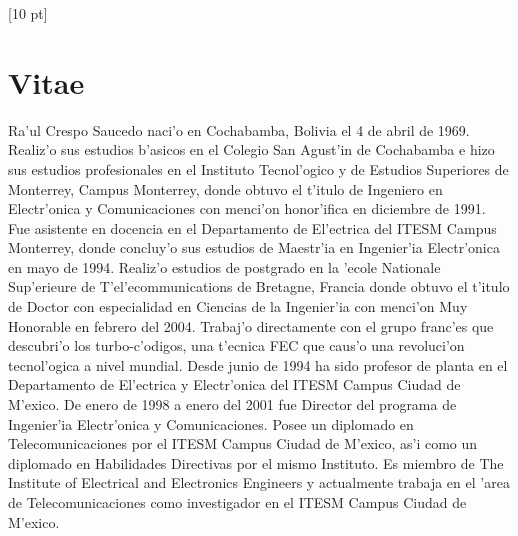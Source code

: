 \titleformat{\chapter}{\Huge\bfseries}{\thechapter}{0 pt}{\rule{340 pt}{3 pt}\\}
\titlespacing{\chapter}{100 pt}{-25 pt}{40 pt}[10 pt]	
\pagestyle{fancy}
\fancyhead[RO,RE]{\thepage}
\fancyfoot[CO,CE]{}

\chapter*{Vitae}

\normalsize
\noindent
Ra'ul Crespo Saucedo naci'o en Cochabamba, Bolivia el 4 de abril de 1969. Realiz'o sus estudios b'asicos en el Colegio San Agust'in de Cochabamba e hizo sus estudios profesionales en el Instituto Tecnol'ogico y de Estudios Superiores de Monterrey, Campus Monterrey, donde obtuvo el t'itulo de Ingeniero en Electr'onica y Comunicaciones con menci'on honor'ifica en diciembre de 1991. Fue asistente en docencia en el Departamento de El'ectrica del ITESM Campus Monterrey, donde concluy'o sus estudios de Maestr'ia en Ingenier'ia Electr'onica en mayo de 1994. Realiz'o estudios de postgrado en la 'ecole Nationale Sup'erieure de T'el'ecommunications de Bretagne, Francia donde obtuvo el t'itulo de Doctor con especialidad en Ciencias de la Ingenier'ia con menci'on Muy Honorable en febrero del 2004. Trabaj'o directamente con el grupo franc'es que descubri'o los turbo-c'odigos, una t'ecnica FEC que caus'o una revoluci'on tecnol'ogica a nivel mundial. Desde junio de 1994 ha sido profesor de planta en el Departamento de El'ectrica y Electr'onica del ITESM Campus Ciudad de M'exico. De enero de 1998 a enero del 2001 fue Director del programa de Ingenier'ia Electr'onica y Comunicaciones. Posee un diplomado en Telecomunicaciones por el ITESM Campus Ciudad de M'exico, as'i como un diplomado en Habilidades Directivas por el mismo Instituto. Es miembro de The Institute of Electrical and Electronics Engineers y actualmente trabaja en el 'area de Telecomunicaciones como investigador en el ITESM Campus Ciudad de M'exico.